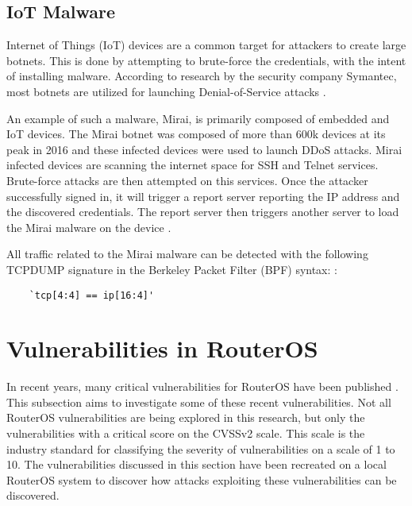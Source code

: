 \subsection{IoT Malware}
Internet of Things (IoT) devices are a common target for attackers to create large botnets. This is done by attempting to brute-force the credentials, with the intent of installing malware. According to research by the security company Symantec, most botnets are utilized for launching Denial-of-Service attacks \cite{IOTMALWARE:SYMANTEC:2016}.

An example of such a malware, Mirai, is primarily composed of embedded and IoT devices. The Mirai botnet was composed of more than 600k devices at its peak in 2016 and these infected devices were used to launch DDoS attacks. Mirai infected devices are scanning the internet space for SSH and Telnet services. Brute-force attacks are then attempted on this services. Once the attacker successfully signed in, it will trigger a report server reporting the IP address and the discovered credentials. The report server then triggers another server to load the Mirai malware on the device \cite{UNDERSTANDINGMIRAI:USENIX:2017}. 

All traffic related to the Mirai malware can be detected with the following TCPDUMP signature in the Berkeley Packet Filter (BPF) syntax: \cite{IMPROVINGIOTBOTNET:SENSORS:2018}:
\begin{verbatim}
    `tcp[4:4] == ip[16:4]'
\end{verbatim}

\section{Vulnerabilities in RouterOS}
In recent years, many critical vulnerabilities for RouterOS have been published  \cite{CVELIST}. This subsection aims to investigate some of these recent vulnerabilities. Not all RouterOS vulnerabilities are being explored in this research, but only the vulnerabilities with a critical score on the CVSSv2 scale. This scale is the industry standard for classifying the severity of vulnerabilities on a scale of 1 to 10. The vulnerabilities discussed in this section have been recreated on a local RouterOS system to discover how attacks exploiting these vulnerabilities can be discovered.

